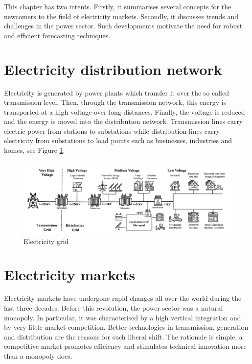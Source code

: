 This chapter has two intents. Firstly, it summarises several concepts for the newcomers to the field of electricity markets. Secondly, it discusses trends and challenges in the power sector. Such developments motivate the need for robust and efficient forecasting techniques.
\section{Electricity distribution network}
Electricity is generated by power plants which transfer it over the so called transmission level. Then, through the transmission network, this energy is transported at a high voltage over long distances. Finally, the voltage is reduced and the energy is moved into the distribution network. Transmission lines carry electric power from stations to substations while distribution lines carry electricity from substations to load points such as businesses, industries and homes, see Figure \ref{electricity_network}.
\begin{figure}[!ht]
    \includegraphics[width=\textwidth]{images/electricity_network.png}
    \caption{Electricity grid \cite{haben2021review}}
    \label{electricity_network}
\end{figure}
\section{Electricity markets}
Electricity markets have undergone rapid changes all over the world during the last three decades.
Before this revolution, the power sector was a natural monopoly. In particular, it was characterised by a high vertical integration and by very little market competition. Better technologies in transmission, generation and distribution are the reasons for such liberal shift. The rationale is simple, a competitive market promotes efficiency and stimulates technical innovation more than a monopoly does.

